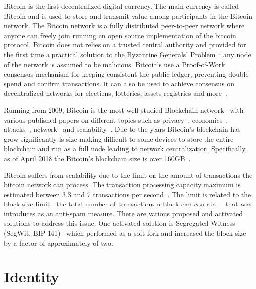 Bitcoin is the first decentralized digital currency. The main currency is called Bitcoin and is used to store and transmit value among participants in the Bitcoin network. The Bitcoin network is a fully distributed peer-to-peer network where anyone can freely join running an open source implementation of the bitcoin protocol. Bitcoin does not relies on a trusted central authority and provided for the first time a practical solution to the Byzantine Generals' Problem~\cite{byzantine_fault_tolerance}; any node of the network is assumed to be malicious. Bitcoin's use a Proof-of-Work consensus mechanism for keeping consistent the public ledger, preventing double spend and confirm transactions. It can also be used to achieve consensus on decentralized networks for elections, lotteries, assets registries and more~\cite{antonopoulos2014mastering}.

Running from 2009, Bitcoin is the most well studied Blockchain network~\cite{10.1007/978-3-662-46803-6_10} with various published papers on different topics such as privacy~\cite{10.1007/978-3-319-70278-0_8, 10.1007/978-3-642-39884-1_2, Bonneau14e.w.:mixcoin, 10.1007/978-3-662-44774-1_9}, economics~\cite{Babaioff:2012:BRB:2229012.2229022, 10.1007/978-3-319-70278-0_17, Bentov2017DecentralizedPM, Carlsten:2016:IBW:2976749.2978408}, attacks~\cite{DBLP:journals_corr_Bahack13, DBLP:journals_corr_EyalS13}, network~\cite{10.1007/978-3-662-44774-1_7, 190890} and scalability~\cite{kiayias2017non, 10.1007/978-3-662-53357-4_5, 10.1007/978-3-662-53357-4_8}. Due to the years Bitcoin's blockchain has grow significantly is size making difficult to some devices to store the entire blockchain and run as a full node leading to network centralization. Specifically, as of April 2018 the Bitcoin's blockchain size is over 160GB~\cite{btc_bl_size}.

Bitcoin suffers from scalability due to the limit on the amount of transactions the bitcoin network can process. The transaction processing capacity maximum is estimated between 3.3 and 7 transactions per second~\cite{10.1007/978-3-662-53357-4_8}. The limit is related to the block size limit---the total number of transactions a block can contain--- that was introduces as an anti-spam measure. There are various proposed and activated solutions to address this issue. One activated solution is Segregated Witness (SegWit, BIP 141)~\cite{segwit} which performed as a soft fork and increased the block size by a factor of approximately of two.

\section{Identity}\label{blockchain:identity}

